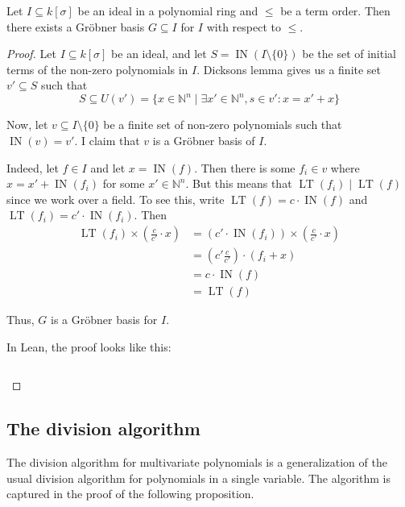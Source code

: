 \documentclass[a4paper, 12pt]{article}
\newcommand{\N}{\mathbb{N}}
\DeclareMathOperator{\IN}{IN}
\DeclareMathOperator{\LT}{LT}
\theoremstyle{changedot}
\theoremstyle{changedotbreak}
\theoremstyle{nonumberplain}
\newtheorem{proof}{Proof}
\begin{document}
\begin{theorem}
  Let $I \subseteq k[\sigma]$ be an ideal in a polynomial ring and $\le$ be a term order. Then there exists a Gröbner basis $G \subseteq I$ for $I$ with respect to $\le$.
\end{theorem}
\begin{proof}
  Let $I \subseteq k[\sigma]$ be an ideal, and let $S = \IN(I \setminus \{0\})$ be the set of initial terms of the non-zero polynomials in $I$. Dicksons lemma gives us a finite set $v' \subseteq S$ such that
  \[S \subseteq U(v') = \{x \in \N^{n} \mid \exists x' \in \N^{n}, s \in v' : x = x' + x\}\]

  Now, let $v \subseteq I\setminus \{0\}$ be a finite set of non-zero polynomials such that $\IN(v) = v'$. I claim that $v$ is a Gröbner basis of $I$.

  Indeed, let $f \in I$ and let $x = \IN(f)$. Then there is some $f_{i} \in v$ where $x = x' + \IN(f_{i})$ for some $x' \in \N^{n}$. But this means that $\LT(f_{i}) \mid \LT(f)$ since we work over a field. To see this, write $\LT(f) = c \cdot \IN(f)$ and $\LT(f_{i}) = c' \cdot \IN(f_{i})$. Then
  \begin{align*}
    \LT(f_{i}) \times \left(\frac{c}{c'} \cdot x\right) &= (c' \cdot \IN(f_{i})) \times \left(\frac{c}{c'} \cdot x\right) \\
                                   &= \left(c' \frac{c}{c'}\right) \cdot (f_{i} + x) \\
                                                    &= c \cdot \IN(f) \\
    &= \LT(f)
  \end{align*}

  Thus, $G$ is a Gröbner basis for $I$.

  In Lean, the proof looks like this:

  \inputminted[firstline=25, lastline=62]{lean}{../src/groebner_basis.lean}
\end{proof}

\subsection{The division algorithm}
The division algorithm for multivariate polynomials is a generalization of the usual division algorithm for polynomials in a single variable. The algorithm is captured in the proof of the following proposition.
\end{document}
